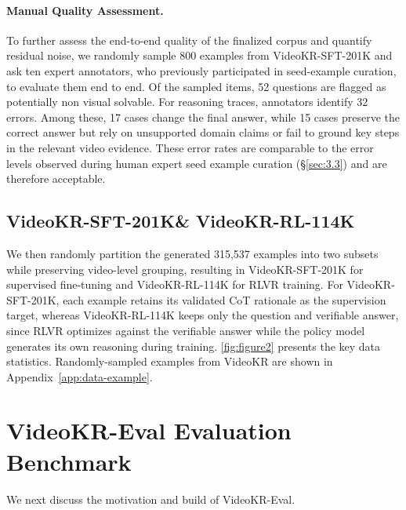 \documentclass{llmxive}
\providecommand{\eval}{VideoKR-Eval\xspace}
\providecommand{\sftdata}{VideoKR-SFT-201K\xspace}
\providecommand{\rldata}{VideoKR-RL-114K\xspace}
\providecommand{\ours}{VideoKR\xspace}
\providecommand{\nexample}{315,537\xspace}
\begin{document}
\vspace{-8pt}
\paragraph{Manual Quality Assessment.} 
To further assess the end-to-end quality of the finalized corpus and quantify residual noise, we randomly sample 800 examples from \sftdata and ask ten expert annotators, who previously participated in seed-example curation, to evaluate them end to end. Of the sampled items, 52 questions are flagged as potentially non visual solvable. For reasoning traces, annotators identify 32 errors. Among these, 17 cases change the final answer, while 15 cases preserve the correct answer but rely on unsupported domain claims or fail to ground key steps in the relevant video evidence. These error rates are comparable to the error levels observed during human expert seed example curation (\S\ref{sec:3.3}) and are therefore acceptable.

\subsection{\sftdata \& \rldata} 
We then randomly partition the generated \nexample examples into two subsets while preserving video-level grouping, resulting in \sftdata for supervised fine-tuning and \rldata for RLVR training.
For \sftdata, each example retains its validated CoT rationale as the supervision target, whereas \rldata keeps only the question and verifiable answer, since RLVR optimizes against the verifiable answer while the policy model generates its own reasoning during training.
\autoref{fig:figure2} presents the key data statistics.
Randomly-sampled examples from \ours are shown in Appendix~\ref{app:data-example}.

\section{\eval Evaluation Benchmark}\label{sec:eval-data}
We next discuss the motivation and build of \eval.
\end{document}
